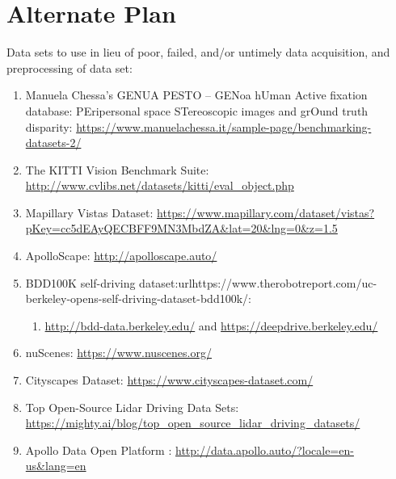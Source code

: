 \documentclass[letter,12pt]{article}
\begin{document}
\section{Alternate Plan}
\label{sec:AlternatePlan}

Data sets to use in lieu of poor, failed, and/or untimely data acquisition, and preprocessing of data set: \vspace{-0.3cm}
\begin{enumerate} \itemsep -4pt
\item Manuela Chessa's GENUA PESTO -- GENoa hUman Active fixation database: PEripersonal space STereoscopic images and grOund truth disparity: \url{https://www.manuelachessa.it/sample-page/benchmarking-datasets-2/}
\item The KITTI Vision Benchmark Suite: \url{http://www.cvlibs.net/datasets/kitti/eval_object.php}
\item Mapillary Vistas Dataset: \url{https://www.mapillary.com/dataset/vistas?pKey=cc5dEAyQECBFF9MN3MbdZA&lat=20&lng=0&z=1.5}
\item ApolloScape: \url{http://apolloscape.auto/}
\item BDD100K self-driving dataset:url{https://www.therobotreport.com/uc-berkeley-opens-self-driving-dataset-bdd100k/}: \vspace{-0.3cm}
	\begin{enumerate} \itemsep -2pt
	\item \url{http://bdd-data.berkeley.edu/} and \url{https://deepdrive.berkeley.edu/}
	\end{enumerate}
\item nuScenes: \url{https://www.nuscenes.org/}
\item Cityscapes Dataset: \url{https://www.cityscapes-dataset.com/}
\item Top Open-Source Lidar Driving Data Sets: \url{https://mighty.ai/blog/top_open_source_lidar_driving_datasets/}
\item Apollo Data Open Platform : \url{http://data.apollo.auto/?locale=en-us&lang=en}
\end{enumerate}









%
%
%

{\linespread{1}


}
\end{document}

